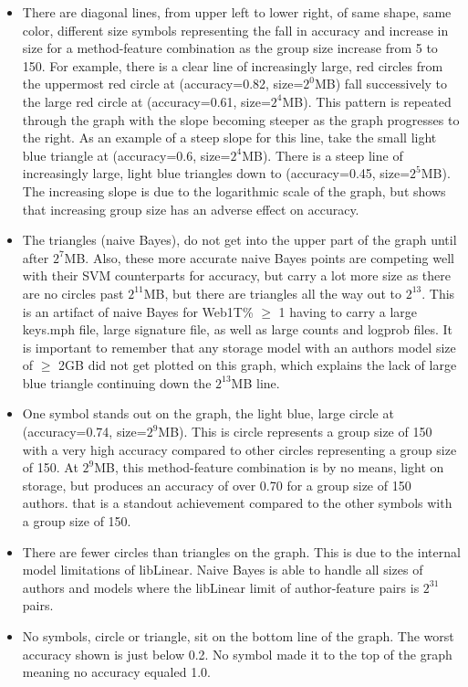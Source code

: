 \begin{itemize}
		\item There are diagonal lines, from upper left to lower right, of same shape, same color, different size symbols representing the fall in accuracy and increase in size for a method-feature combination as the group size increase from 5 to 150.  For example, there is a clear line of increasingly large, red circles from the uppermost red circle at (accuracy=0.82, size=$2^0$MB) fall successively to the large red circle at (accuracy=0.61, size=$2^4$MB).  This pattern is repeated through the graph with the slope becoming steeper as the graph progresses to the right.  As an example of a steep slope for this line, take the small light blue triangle at (accuracy=0.6, size=$2^4$MB).  There is a steep line of increasingly large, light blue triangles down to (accuracy=0.45, size=$2^5$MB).  The increasing slope is due to the logarithmic scale of the graph, but shows that increasing group size has an adverse effect on accuracy.
		\item The triangles (naive Bayes), do not get into the upper part of the graph until after $2^7$MB.  Also, these more accurate naive Bayes points are competing well with their SVM counterparts for accuracy, but carry a lot more size as there are no circles past $2^{11}$MB, but there are triangles all the way out to $2^{13}$.  This is an artifact of naive Bayes for Web1T\% $\ge$ 1 having to carry a large keys.mph file, large signature file, as well as large counts and logprob files. It is important to remember that any storage model with an authors model size of $\ge$ 2GB did not get plotted on this graph, which explains the lack of large blue triangle continuing down the $2^{13}$MB line.
		\item One symbol stands out on the graph, the light blue, large circle at (accuracy=0.74, size=$2^9$MB).  This is circle represents a group size of 150 with a very high accuracy compared to other circles representing a group size of 150.  At $2^9$MB, this method-feature combination is by no means, light on storage, but produces an accuracy of over 0.70 for a group size of 150 authors.  that is a standout achievement compared to the other symbols with a group size of 150.
		\item There are fewer circles than triangles on the graph.  This is due to the internal model limitations of libLinear.  Naive Bayes is able to handle all sizes of authors and models where the libLinear limit of author-feature pairs is $2^31$ pairs.
		\item No symbols, circle or triangle, sit on the bottom line of the graph.  The worst accuracy shown is just below 0.2. No symbol made it to the top of the graph meaning no accuracy equaled 1.0.
	\end{itemize}
		
